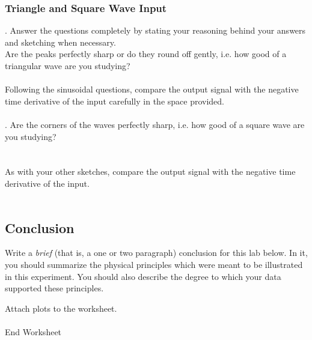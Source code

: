 \subsubsection{Triangle and Square Wave Input}
. Answer the questions completely by  stating your 
reasoning
behind your answers and sketching when necessary. 
\ \\
\noindent Are the peaks perfectly sharp or do they round off gently, i.e.
how good of a triangular wave are you studying? \\
\vspace*{1.5cm} \\
\noindent Following the sinusoidal questions, compare the output signal with 
the negative time 
derivative of the input carefully in the space provided. \\
\vspace*{3.5cm} \\
.
\noindent Are the corners of the waves perfectly sharp, i.e. how good 
of a square wave are you studying? \\
\vspace*{1cm} \\
\vspace*{1cm} \\
\noindent As with your other sketches, compare the output signal with 
the negative time derivative of the input. \\
\vspace*{3cm} \\
\clearpage

\subsection{Conclusion}

Write a {\it brief} (that is, a one or two paragraph) conclusion for
this lab below. In it, you should summarize the physical
principles which were meant to be illustrated in this experiment. You
should also describe the degree to which your data supported these
principles.

\vfill
\noindent Attach plots to the worksheet. \\
\ \\
{\Large End Worksheet} 
\renewcommand{\thesection}{\thechapter.\arabic{section}}














